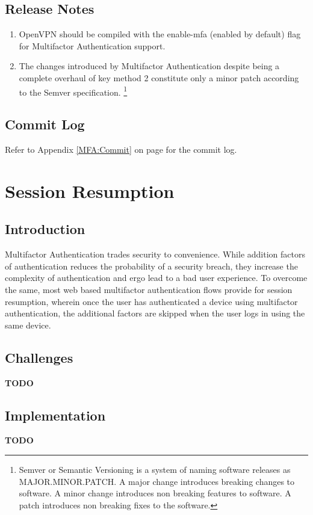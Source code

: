 \documentclass[11pt,oneside]{book}
\begin{document}
\section{Release Notes}
\begin{enumerate}
    \item OpenVPN should be compiled with the enable-mfa (enabled by default) flag for Multifactor
        Authentication support.
    \item The changes introduced by Multifactor Authentication despite being a complete overhaul of key method
          2 constitute only a minor patch according to the Semver specification. \footnote{Semver or Semantic
          Versioning is a system of naming software releases as MAJOR.MINOR.PATCH. A major change introduces
          breaking changes to software. A minor change introduces non breaking features to software.
          A patch introduces non breaking fixes to the software.}
\end{enumerate}

\section{Commit Log}
Refer to Appendix \ref{MFA:Commit} on page \pageref{MFA:Commit} for the commit log.

\chapter{Session Resumption}
\section{Introduction}
Multifactor Authentication trades security to convenience. While addition factors of authentication
reduces the probability of a security breach, they increase the complexity of authentication and
ergo lead to a bad user experience. To overcome the same, most web based multifactor authentication
flows provide for session resumption, wherein once the user has authenticated a device using
multifactor authentication, the additional factors are skipped when the user logs in using the same
device.

\section{Challenges}
\textbf{TODO}

\section{Implementation}
\textbf{TODO}
\end{document}
